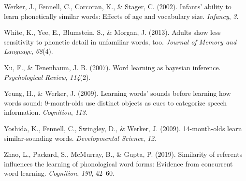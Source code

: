 \documentclass[english,,man]{apa6}
\begin{document}
\leavevmode\hypertarget{ref-werker2002}{}%
Werker, J., Fennell, C., Corcoran, K., \& Stager, C. (2002). Infants' ability to learn phonetically similar words: Effects of age and vocabulary size. \emph{Infancy}, \emph{3}.

\leavevmode\hypertarget{ref-white2013}{}%
White, K., Yee, E., Blumstein, S., \& Morgan, J. (2013). Adults show less sensitivity to phonetic detail in unfamiliar words, too. \emph{Journal of Memory and Language}, \emph{68}(4).

\leavevmode\hypertarget{ref-xu2007}{}%
Xu, F., \& Tenenbaum, J. B. (2007). Word learning as bayesian inference. \emph{Psychological Review}, \emph{114}(2).

\leavevmode\hypertarget{ref-yeung09}{}%
Yeung, H., \& Werker, J. (2009). Learning words' sounds before learning how words sound: 9-month-olds use distinct objects as cues to categorize speech information. \emph{Cognition}, \emph{113}.

\leavevmode\hypertarget{ref-yoshida2009}{}%
Yoshida, K., Fennell, C., Swingley, D., \& Werker, J. (2009). 14-month-olds learn similar-sounding words. \emph{Developmental Science}, \emph{12}.

\leavevmode\hypertarget{ref-Zhao2019}{}%
Zhao, L., Packard, S., McMurray, B., \& Gupta, P. (2019). Similarity of referents influences the learning of phonological word forms: Evidence from concurrent word learning. \emph{Cognition}, \emph{190}, 42--60.

\clearpage
\renewcommand{\listfigurename}{Figure captions}
\end{document}
